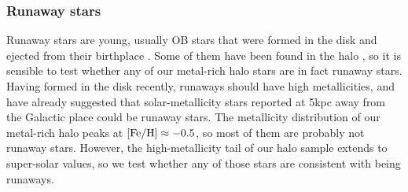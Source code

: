 \documentclass[apj, twocolappendix, numberedappendix, appendixfloats]{emulateapj}
\begin{document}
\subsubsection{Runaway stars}
\label{sec:runaway}

Runaway stars are young, usually OB stars that were formed in the disk and ejected from their birthplace \citep{blaauw1961}.
Some of them have been found in the halo \citep[e.g.,][]{conlon1990}, so it is sensible to test whether any of our metal-rich halo stars are in fact runaway stars.
Having formed in the disk recently, runaways should have high metallicities, and \citet{bromley2009} have already suggested that solar-metallicity stars reported at 5\;kpc away from the Galactic place \citep{ivezic2008} could be runaway stars.
The metallicity distribution of our metal-rich halo peaks at $\rm[Fe/H]\approx-0.5$, so most of them are probably not runaway stars.
However, the high-metallicity tail of our halo sample extends to super-solar values, so we test whether any of those stars are consistent with being runaways.
\end{document}
